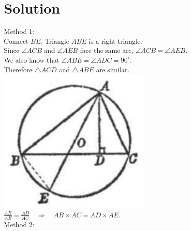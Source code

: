 \documentclass{article}
\begin{document}
\section*{Solution}
Method 1:\\
Connect \(B E\). Triangle \(A B E\) is a right triangle.\\
Since \(\angle A C B\) and \(\angle A E B\) face the same arc, \(\angle A C B=\angle A E B\).\\
We also know that \(\angle A B E=\angle A D C=90^{\circ}\).\\
Therefore \(\triangle A C D\) and \(\triangle A B E\) are similar.\\
\centering
\includegraphics[width=\textwidth]{images/172(1).jpg}\\
\(\frac{A B}{A E}=\frac{A D}{A C} \quad \Rightarrow \quad A B \times A C=A D \times A E\).\\
Method 2:
\end{document}
